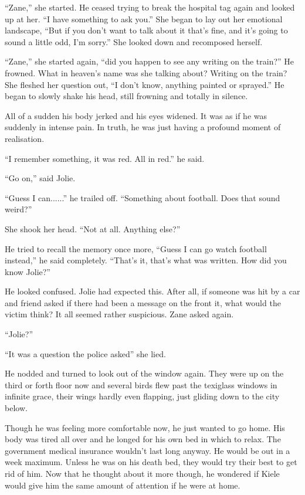 ``Zane,'' she started.  He ceased trying to break the hospital tag again and looked up at her.  ``I have something to ask you.''  She began to lay out her emotional landscape, ``But if you don't want to talk about it that's fine, and it's going to sound a little odd, I'm sorry.''  She looked down and recomposed herself.

``Zane,'' she started again, ``did you happen to see any writing on the train?''  He frowned.  What in heaven's name was she talking about?  Writing on the train?  She fleshed her question out, ``I don't know, anything painted or sprayed.''  He began to slowly shake his head, still frowning and totally in silence.

All of a sudden his body jerked and his eyes widened.  It was as if he was suddenly in intense pain.  In truth, he was just having a profound moment of realisation.  

``I remember something, it was red.  All in red.'' he said.

``Go on,'' said Jolie.

``Guess I can......'' he trailed off.  ``Something about football.  Does that sound weird?''  

She shook her head.  ``Not at all.  Anything else?''

He tried to recall the memory once more, ``Guess I can go watch football instead,'' he said completely.  ``That's it, that's what was written.  How did you know Jolie?''

He looked confused.  Jolie had expected this.  After all, if someone was hit by a car and friend asked if there had been a message on the front it, what would the victim think?  It all seemed rather suspicious.  Zane asked again.

``Jolie?''

``It was a question the police asked'' she lied.

He nodded and turned to look out of the window again.  They were up on the third or forth floor now and several birds flew past the texiglass windows in infinite grace, their wings hardly even flapping, just gliding down to the city below.

Though he was feeling more comfortable now, he just wanted to go home.  His body was tired all over and he longed for his own bed in which to relax.  The government medical insurance wouldn't last long anyway.  He would be out in a week maximum.  Unless he was on his death bed, they would try their best to get rid of him.  Now that he thought about it more though, he wondered if Kiele would give him the same amount of attention if he were at home.  



